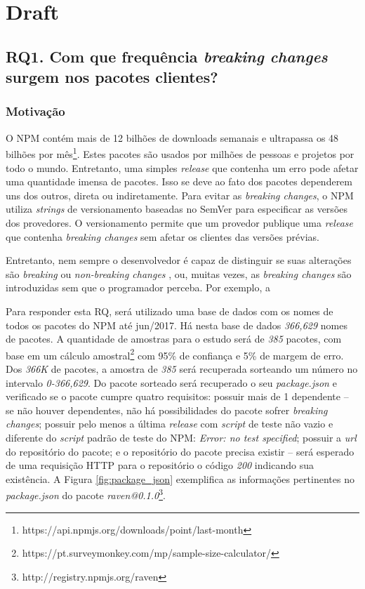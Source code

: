 \chapter{Draft}

\section{RQ1. Com que frequência \textit{breaking changes} surgem nos pacotes clientes?}
\label{sec:rq1}

\subsection{Motivação}
\label{mot:rq1}

O \Gls{NPM} contém mais de 12 bilhões de downloads semanais e ultrapassa os 48 bilhões por mês\footnote{https://api.npmjs.org/downloads/point/last-month}. Estes pacotes são usados por milhões de pessoas e projetos por todo o mundo. Entretanto, uma simples \textit{release} que contenha um erro pode afetar uma quantidade imensa de pacotes. Isso se deve ao fato dos pacotes dependerem uns dos outros, direta ou indiretamente. Para evitar as \textit{breaking changes}, o \Gls{NPM} utiliza \textit{strings} de versionamento baseadas no \Gls{SemVer} para especificar as versões dos provedores. O versionamento permite que um provedor publique uma \textit{release} que contenha \textit{breaking changes} sem afetar os clientes das versões prévias.

Entretanto, nem sempre o desenvolvedor é capaz de distinguir se suas alterações são \textit{breaking} ou \textit{non-breaking changes} \cite{noregrets2018}, ou, muitas vezes, as \textit{breaking changes} são introduzidas sem que o programador perceba. Por exemplo, a 

Para responder esta RQ, será utilizado uma base de dados com os nomes de todos os pacotes do \Gls{NPM} até jun/2017. Há nesta base de dados \textit{366,629} nomes de pacotes. A quantidade de amostras para o estudo será de \textit{385} pacotes, com base em um cálculo amostral\footnote{https://pt.surveymonkey.com/mp/sample-size-calculator/} com 95\% de confiança e 5\% de margem de erro. Dos \textit{366K} de pacotes, a amostra de \textit{385} será recuperada sorteando um número no intervalo \textit{0-366,629}. Do pacote sorteado será recuperado o seu \textit{package.json} e verificado se o pacote cumpre quatro requisitos: possuir mais de 1 dependente --  se não houver dependentes, não há possibilidades do pacote sofrer \textit{breaking changes}; possuir pelo menos a última \textit{release} com \textit{script} de teste não vazio e diferente do \textit{script} padrão de teste do \gls{NPM}: \textit{Error: no test specified}; possuir a \textit{url} do repositório do pacote; e o repositório do pacote precisa existir -- será esperado de uma requisição \Gls{HTTP} para o repositório o código \textit{200} indicando sua existência. A Figura \ref{fig:package_json} exemplifica as informações pertinentes no \textit{package.json} do pacote \textit{raven@0.1.0}\footnote{http://registry.npmjs.org/raven}.

